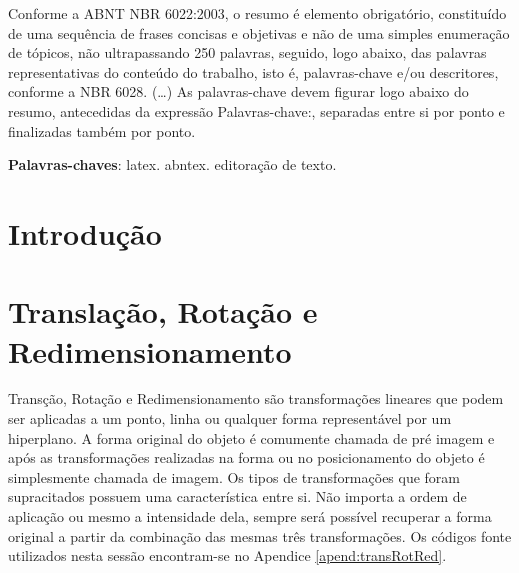\documentclass[
	article,			%
	11pt,				%
	oneside,			%
	a4paper,			%
	english,			%
	brazil,				%
	sumario=tradicional
	]{abntex2}
\begin{document}



%
%
\maketitle
\frenchspacing 
\begin{resumoumacoluna}
 Conforme a ABNT NBR 6022:2003, o resumo é elemento obrigatório, constituído de
 uma sequência de frases concisas e objetivas e não de uma simples enumeração
 de tópicos, não ultrapassando 250 palavras, seguido, logo abaixo, das palavras
 representativas do conteúdo do trabalho, isto é, palavras-chave e/ou
 descritores, conforme a NBR 6028. (\ldots) As palavras-chave devem figurar logo
 abaixo do resumo, antecedidas da expressão Palavras-chave:, separadas entre si por
 ponto e finalizadas também por ponto.
 
 \vspace{\onelineskip}
 
 \noindent
 \textbf{Palavras-chaves}: latex. abntex. editoração de texto.
\end{resumoumacoluna}


\textual

\section*{Introdução}


\section{Translação, Rotação e Redimensionamento}
Transção, Rotação e Redimensionamento são transformações lineares que podem ser
aplicadas a um ponto, linha ou qualquer forma representável por um hiperplano.
A forma original do objeto é comumente chamada de pré imagem e após as
transformações realizadas na forma ou no posicionamento do objeto é simplesmente
chamada de imagem.
Os tipos de transformações que foram supracitados possuem uma característica
entre si. Não importa a ordem de aplicação ou mesmo a intensidade dela, sempre
será possível recuperar a forma original a partir da combinação das mesmas três
transformações. Os códigos fonte utilizados nesta sessão encontram-se no
Apendice \ref{apend:transRotRed}.
 
\end{document}
